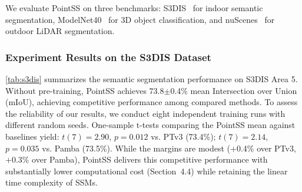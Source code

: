 \documentclass[a4paper,fleqn]{cas-sc}
\begin{document}
We evaluate PointSS on three benchmarks: S3DIS~\cite{s3dis} for indoor semantic segmentation, ModelNet40~\cite{ModelNet40} for 3D object classification, and nuScenes~\cite{nuscenes} for outdoor LiDAR segmentation.

\subsubsection{Experiment Results on the S3DIS Dataset}

\cref{tab:s3dis} summarizes the semantic segmentation performance on S3DIS Area 5. Without pre-training, PointSS achieves 73.8$\pm$0.4\% mean Intersection over Union (mIoU), achieving competitive performance among compared methods. To assess the reliability of our results, we conduct eight independent training runs with different random seeds. One-sample t-tests comparing the PointSS mean against baselines yield: $t(7)=2.90$, $p=0.012$ vs. PTv3 (73.4\%); $t(7)=2.14$, $p=0.035$ vs. Pamba (73.5\%). While the margins are modest (+0.4\% over PTv3, +0.3\% over Pamba), PointSS delivers this competitive performance with substantially lower computational cost (Section~4.4) while retaining the linear time complexity of SSMs.
\end{document}

